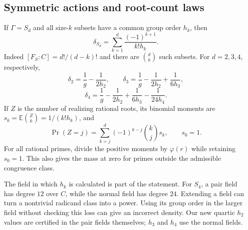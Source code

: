 \documentclass[11pt]{article}
\theoremstyle{definition}\newtheorem{definition}[theorem]{Definition}
\newcommand{\Prob}{\operatorname{Pr}}
\newcommand{\EE}{\mathbb E}
\begin{document}
\subsection{Symmetric actions and root-count laws}
If $\Gamma=S_d$ and all size-$k$ subsets have a common group order
$h_k$, then
\begin{equation}\label{eq:Sn}
 \delta_{S_d}=\sum_{k=1}^d\frac{(-1)^{k+1}}{k!h_k}.
\end{equation}
Indeed $[F_S:C]=d!/(d-k)!$ and there are $\binom dk$ such subsets.
For $d=2,3,4$, respectively,
\[
 \delta_2=\frac1g-\frac1{2h_2},\qquad
 \delta_3=\frac1g-\frac1{2h_2}+\frac1{6h_3},
\]
\[
 \delta_4=\frac1g-\frac1{2h_2}+\frac1{6h_3}-\frac1{24h_4}.
\]
If $Z$ is the number of realizing rational roots, its binomial
moments are $s_k=\EE\binom Zk=1/(k!h_k)$, and
\begin{equation}\label{eq:rootlaw}
 \Prob(Z=j)=\sum_{k=j}^d(-1)^{k-j}\binom kj s_k,
 \qquad s_0=1.
\end{equation}
For all rational primes, divide the positive moments by
$\varphi(r)$ while retaining $s_0=1$. This also gives the mass at
zero for primes outside the admissible congruence class.

The field in which $h_k$ is calculated is part of the statement.
For $S_4$, a pair field has degree $12$ over $C$, while the normal
field has degree $24$. Extending a field can turn a nontrivial
radicand class into a power. Using its group order in the larger
field without checking this loss can give an incorrect density.
Our new quartic $h_2$ values are certified in the pair fields
themselves; $h_3$ and $h_4$ use the normal fields.
\end{document}
